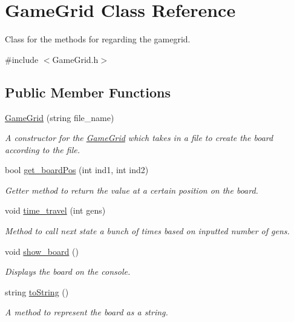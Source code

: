 \hypertarget{class_game_grid}{}\section{Game\+Grid Class Reference}
\label{class_game_grid}


Class for the methods for regarding the gamegrid.  




{\ttfamily \#include $<$Game\+Grid.\+h$>$}

\subsection*{Public Member Functions}
\begin{DoxyCompactItemize}
\item 
\mbox{\hyperlink{class_game_grid_a0844b34c3f8bd3a41b0dff38ffb10f36}{Game\+Grid}} (string file\+\_\+name)
\begin{DoxyCompactList}\small\item\em A constructor for the \mbox{\hyperlink{class_game_grid}{Game\+Grid}} which takes in a file to create the board according to the file. \end{DoxyCompactList}\item 
bool \mbox{\hyperlink{class_game_grid_af67b81833fc836276077ba8d928a0111}{get\+\_\+board\+Pos}} (int ind1, int ind2)
\begin{DoxyCompactList}\small\item\em Getter method to return the value at a certain position on the board. \end{DoxyCompactList}\item 
void \mbox{\hyperlink{class_game_grid_a9c207942c6e8c40a4f7735295e535e3e}{time\+\_\+travel}} (int gens)
\begin{DoxyCompactList}\small\item\em Method to call next state a bunch of times based on inputted number of gens. \end{DoxyCompactList}\item 
\mbox{\label{class_game_grid_acc576de797d98d3dd1c9539002db9284}} 
void \mbox{\hyperlink{class_game_grid_acc576de797d98d3dd1c9539002db9284}{show\+\_\+board}} ()
\begin{DoxyCompactList}\small\item\em Displays the board on the console. \end{DoxyCompactList}\item 
string \mbox{\hyperlink{class_game_grid_acea99c50b01e9e7c47ff4c23494efde1}{to\+String}} ()
\begin{DoxyCompactList}\small\item\em A method to represent the board as a string. \end{DoxyCompactList}\end{DoxyCompactItemize}


